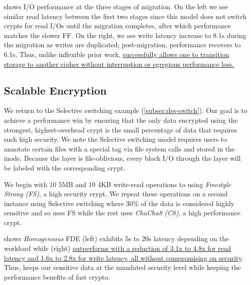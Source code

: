 

 shows I/O performance at the three stages of
migration. On the left we see similar read latency between the first two stages
since this model does not switch crypts for read I/Os until the migration
completes, after which performance matches the slower FF. On the right, we see
write latency increase to 8.1s during the migration as writes are duplicated;
post-migration, performance recovers to 6.1s. Thus, unlike inflexible prior
work, \sys \uline{successfully allows one to transition storage to another
cipher without interruption or egregious performance loss.}


\subsection{Scalable Encryption}\label{subsec:usecase-scalable}

We return to the Selective switching example (\cref{subsec:des-switch}). Our
goal is to achieve a performance win by ensuring that the only data encrypted
using the strongest, highest-overhead crypt is the small percentage of data that
requires such high security. We note the Selective switching model requires
users to annotate certain files with a special tag via file system calls and
stored in the inode. Because the \sys layer is file-oblivious, every block I/O
through the \sys layer will be labeled with the corresponding crypt.

We begin with 10 5MB and 10 4KB write-read operations to \sys using {\em
Freestyle Strong (FS)}, a high security crypt. We repeat these operations on a
second instance using Selective switching where 30\% of the data is considered
highly sensitive and so uses FS while the rest uses {\em ChaCha8 (C8)}, a high
performance crypt.



 shows {\em Homogeneous} FDE (left) exhibits 5s to
20s latency depending on the workload while \sys (right) \uline{outperforms with
a reduction of 3.1x to 4.8x for read latency and 1.6x to 2.8x for write latency,
all without compromising on security}. Thus, \sys keeps our sensitive data at
the mandated security level while keeping the performance benefits of fast
crypto.
